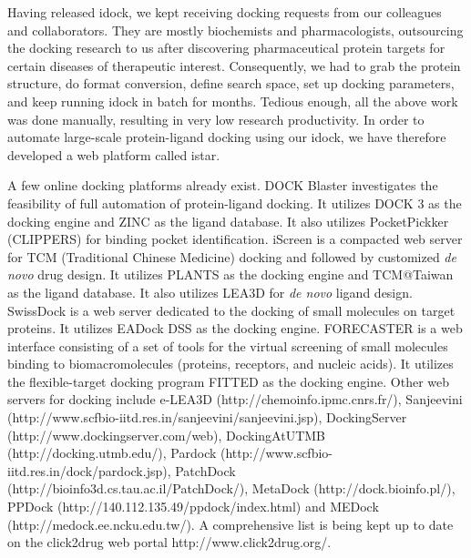 Having released idock, we kept receiving docking requests from our colleagues and collaborators. They are mostly biochemists and pharmacologists, outsourcing the docking research to us after discovering pharmaceutical protein targets for certain diseases of therapeutic interest. Consequently, we had to grab the protein structure, do format conversion, define search space, set up docking parameters, and keep running idock in batch for months. Tedious enough, all the above work was done manually, resulting in very low research productivity. In order to automate large-scale protein-ligand docking using our idock, we have therefore developed a web platform called istar.

A few online docking platforms already exist. DOCK Blaster \citep{557} investigates the feasibility of full automation of protein-ligand docking. It utilizes DOCK 3 \citep{1445} as the docking engine and ZINC \citep{532,1178} as the ligand database. It also utilizes PocketPickker (CLIPPERS) \citep{395} for binding pocket identification. iScreen \citep{899} is a compacted web server for TCM (Traditional Chinese Medicine) docking and followed by customized \textit{de novo} drug design. It utilizes PLANTS \citep{610,607,779} as the docking engine and TCM@Taiwan \citep{528} as the ligand database. It also utilizes LEA3D \citep{1223} for \textit{de novo} ligand design. SwissDock \citep{1425} is a web server dedicated to the docking of small molecules on target proteins. It utilizes EADock DSS \citep{606,781} as the docking engine. FORECASTER \citep{1012} is a web interface consisting of a set of tools for the virtual screening of small molecules binding to biomacromolecules (proteins, receptors, and nucleic acids). It utilizes the flexible-target docking program FITTED \citep{602} as the docking engine. Other web servers for docking include e-LEA3D (http://chemoinfo.ipmc.cnrs.fr/), Sanjeevini (http://www.scfbio-iitd.res.in/sanjeevini/sanjeevini.jsp), DockingServer (http://www.dockingserver.com/web), DockingAtUTMB (http://docking.utmb.edu/), Pardock (http://www.scfbio-iitd.res.in/dock/pardock.jsp), PatchDock (http://bioinfo3d.cs.tau.ac.il/PatchDock/), MetaDock (http://dock.bioinfo.pl/), PPDock (http://140.112.135.49/ppdock/index.html) and MEDock (http://medock.ee.ncku.edu.tw/). A comprehensive list is being kept up to date on the click2drug web portal http://www.click2drug.org/.%

